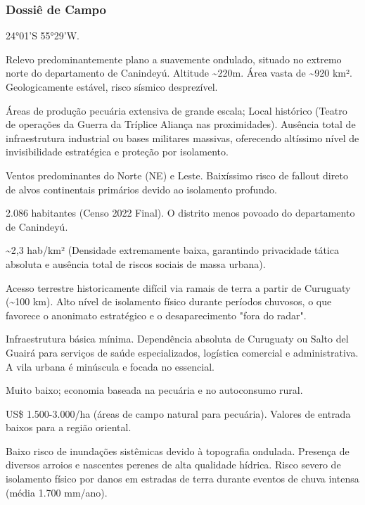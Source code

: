 \subsubsection{Dossiê de Campo}
\begin{description}[style=nextline,leftmargin=0.5cm,font=\bfseries]
\item[Coordenadas]  24°01'S 55°29'W.
\item[Topographical]  Relevo predominantemente plano a suavemente ondulado, situado no extremo norte do departamento de Canindeyú. Altitude \textasciitilde 220m. Área vasta de \textasciitilde 920 km². Geologicamente estável, risco sísmico desprezível.
\item[Alvos Estratégicos]  Áreas de produção pecuária extensiva de grande escala; Local histórico (Teatro de operações da Guerra da Tríplice Aliança nas proximidades). Ausência total de infraestrutura industrial ou bases militares massivas, oferecendo altíssimo nível de invisibilidade estratégica e proteção por isolamento.
\item[Fallout]  Ventos predominantes do Norte (NE) e Leste. Baixíssimo risco de fallout direto de alvos continentais primários devido ao isolamento profundo.
\item[População]  2.086 habitantes (Censo 2022 Final). O distrito menos povoado do departamento de Canindeyú.
\item[Densidade]  \textasciitilde 2,3 hab/\allowbreak km² (Densidade extremamente baixa, garantindo privacidade tática absoluta e ausência total de riscos sociais de massa urbana).
\item[Vias de Acesso]  Acesso terrestre historicamente difícil via ramais de terra a partir de Curuguaty (\textasciitilde 100 km). Alto nível de isolamento físico durante períodos chuvosos, o que favorece o anonimato estratégico e o desaparecimento "fora do radar".
\item[Serviços]  Infraestrutura básica mínima. Dependência absoluta de Curuguaty ou Salto del Guairá para serviços de saúde especializados, logística comercial e administrativa. A vila urbana é minúscula e focada no essencial.
\item[Custo de Vida]  Muito baixo; economia baseada na pecuária e no autoconsumo rural.
\item[Preço da Terra]  US\$ 1.500-3.000/\allowbreak ha (áreas de campo natural para pecuária). Valores de entrada baixos para a região oriental.
\item[Hidrologia]  Baixo risco de inundações sistêmicas devido à topografia ondulada. Presença de diversos arroios e nascentes perenes de alta qualidade hídrica. Risco severo de isolamento físico por danos em estradas de terra durante eventos de chuva intensa (média 1.700 mm/\allowbreak ano).

\end{description}
